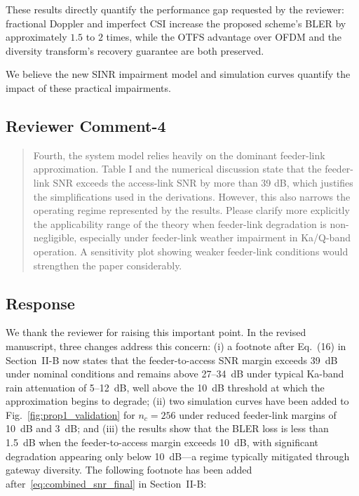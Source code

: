 These results directly quantify the performance gap requested by the reviewer: fractional Doppler and imperfect CSI increase the proposed scheme's BLER by approximately $1.5$ to $2$ times, while the OTFS advantage over OFDM and the diversity transform's recovery guarantee are both preserved.

We believe the new SINR impairment model and simulation curves quantify the impact of these practical impairments.


\subsection{Reviewer Comment-4}



\begin{mdframed}
\begin{quote}
Fourth, the system model relies heavily on the dominant feeder-link approximation. Table I and the numerical discussion state that the feeder-link SNR exceeds the access-link SNR by more than 39 dB, which justifies the simplifications used in the derivations. However, this also narrows the operating regime represented by the results. Please clarify more explicitly the applicability range of the theory when feeder-link degradation is non-negligible, especially under feeder-link weather impairment in Ka/Q-band operation. A sensitivity plot showing weaker feeder-link conditions would strengthen the paper considerably.

\end{quote}

\end{mdframed}


\subsection{Response}

We thank the reviewer for raising this important point. In the revised manuscript, three changes address this concern: (i) a footnote after Eq.~(16) in Section~II-B now states that the feeder-to-access SNR margin exceeds 39~dB under nominal conditions and remains above 27--34~dB under typical Ka-band rain attenuation of 5--12~dB, well above the 10~dB threshold at which the approximation begins to degrade; (ii) two simulation curves have been added to Fig.~\ref{fig:prop1_validation} for $n_c = 256$ under reduced feeder-link margins of 10~dB and 3~dB; and (iii) the results show that the BLER loss is less than 1.5~dB when the feeder-to-access margin exceeds 10~dB, with significant degradation appearing only below 10~dB---a regime typically mitigated through gateway diversity. The following footnote has been added after~\eqref{eq:combined_snr_final} in Section~II-B:

